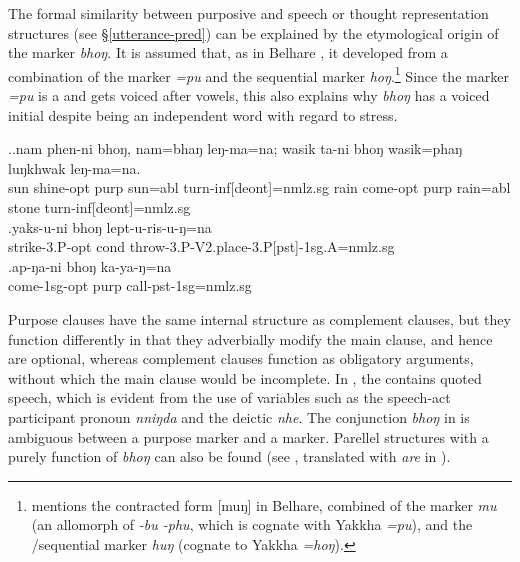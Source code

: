The formal similarity between purposive and speech or thought representation structures (see §\ref{utterance-pred}) can be explained by the etymological origin of the marker \emph{bhoŋ}. It is assumed that, as in Belhare \citep{Bickel1993Belhare},  it developed from a combination of the   marker \emph{=pu} and the sequential marker \emph{hoŋ}.\footnote{\citet{Bickel1993Belhare} mentions the contracted form [muŋ] in Belhare, combined of the  marker \emph{mu} (an allomorph of \emph{-bu \ti -phu}, which is cognate with Yakkha \emph{=pu}), and the /sequential marker \emph{huŋ} (cognate to Yakkha \emph{=hoŋ}).}    Since the  marker \emph{=pu} is a  and gets voiced after vowels, this also explains why \emph{bhoŋ} has a voiced initial despite being an independent word with regard to stress.

\ex.\ag.nam phen-ni     bhoŋ, nam=bhaŋ   leŋ-ma=na; wasik ta-ni      bhoŋ wasik=phaŋ   luŋkhwak leŋ-ma=na.\\
sun shine{\sc [3sg;sbjv]-opt} {\sc purp}   sun{\sc =abl}   turn{\sc -inf[deont]=nmlz.sg}  rain come{\sc [3sg;sbjv]-opt} {\sc purp} rain{\sc =abl} stone turn{\sc -inf[deont]=nmlz.sg}\\
 
\bg.yaks-u-ni bhoŋ lept-u-ris-u-ŋ=na\\
strike{\sc -3.P-opt} {\sc cond}  throw{\sc -3.P-V2.place-3.P[pst]-1sg.A=nmlz.sg}\\
\bg.ap-ŋa-ni bhoŋ ka-ya-ŋ=na\\
come{\sc -1sg-opt} {\sc purp} call{\sc -pst-1sg=nmlz.sg}\\

Purpose clauses have the same internal structure as complement clauses, but they function differently in that they adverbially modify the main clause, and hence are optional, whereas complement clauses function as obligatory arguments, without which the main clause would be incomplete.
 In \Next[a], the  contains quoted speech, which is evident from the use of variables such as the speech-act participant pronoun \emph{nniŋda} and the deictic  \emph{nhe}. The conjunction \emph{bhoŋ} in \Next[a] is ambiguous between a purpose marker and a  marker. Parellel  structures with a purely  function of \emph{bhoŋ} can also be found (see \Next[b], translated with \emph{are} in ). 

